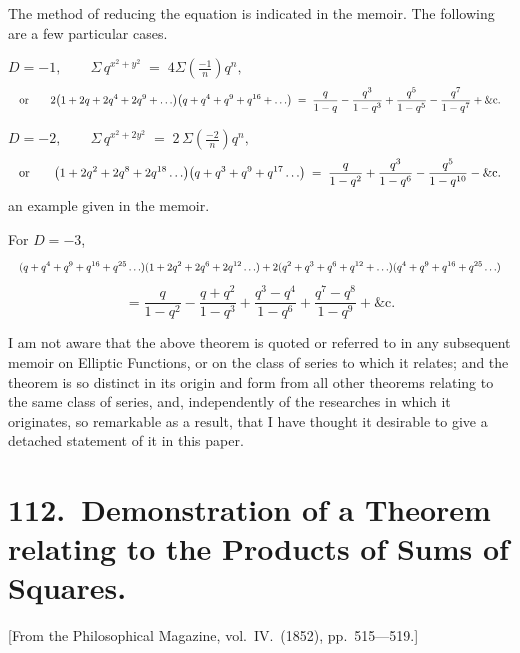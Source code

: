 \documentclass[11pt,a4paper]{article}
\theoremstyle{plain}
\begin{document}
The method of reducing the equation is indicated in the memoir. The following are a few particular cases.

\medskip
$D = -1,\qquad \displaystyle\Sigma\, q^{x^2+y^2} \;=\; 4 \Sigma\!\left(\tfrac{-1}{n}\right) q^n,$
\[
\resizebox{\textwidth}{!}{$\displaystyle \text{or}\qquad 2\bigl(1 + 2q + 2q^4 + 2q^9 + \ldots\bigr)\bigl(q + q^4 + q^9 + q^{16} + \ldots\bigr) \;=\; \frac{q}{1-q} - \frac{q^3}{1-q^3} + \frac{q^5}{1-q^5} - \frac{q^7}{1-q^7} + \&\text{c.} $}
\]

\medskip
$D = -2,\qquad \displaystyle\Sigma\, q^{x^2 + 2 y^2} \;=\; 2\,\Sigma\!\left(\tfrac{-2}{n}\right) q^{n},$
\[
\resizebox{\textwidth}{!}{$\displaystyle \text{or}\qquad \bigl(1 + 2 q^2 + 2 q^8 + 2 q^{18}\ldots\bigr)\bigl(q + q^3 + q^9 + q^{17}\ldots\bigr) \;=\; \frac{q}{1-q^2} + \frac{q^3}{1-q^6} - \frac{q^5}{1-q^{10}} - \&\text{c.} $}
\]
an example given in the memoir.

\medskip
For $D = -3$,
\[
\resizebox{\textwidth}{!}{$\displaystyle (q + q^4 + q^9 + q^{16} + q^{25}\ldots)(1 + 2 q^2 + 2 q^6 + 2 q^{12}\ldots) + 2 (q^2 + q^3 + q^6 + q^{12} + \ldots)(q^4 + q^9 + q^{16} + q^{25}\ldots) $}
\]
\[= \frac{q}{1-q^2} - \frac{q + q^2}{1-q^3} + \frac{q^3 - q^4}{1-q^6} + \frac{q^7 - q^8}{1-q^9} + \&\text{c.}\]

\medskip
I am not aware that the above theorem is quoted or referred to in any subsequent memoir on Elliptic Functions, or on the class of series to which it relates; and the theorem is so distinct in its origin and form from all other theorems relating to the same class of series, and, independently of the researches in which it originates, so remarkable as a result, that I have thought it desirable to give a detached statement of it in this paper.
\clearpage


\section*{112.\ Demonstration of a Theorem relating to the Products of Sums of Squares.}

[From the Philosophical Magazine, vol.\ IV.\ (1852), pp.\ 515---519.]

\bigskip
\end{document}
